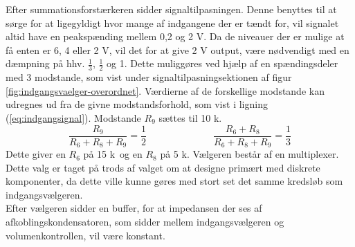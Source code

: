 Efter summationsforstærkeren sidder signaltilpasningen. Denne benyttes til at sørge for at ligegyldigt hvor mange af indgangene der er tændt for, vil signalet altid have en peakspænding mellem 0,2 og 2 V. Da de niveauer der er mulige at få enten er 6, 4 eller 2 V, vil det for at give 2 V output, være nødvendigt med en dæmpning på hhv. $\frac{1}{3}$, $\frac{1}{2}$ og 1. Dette muliggøres ved hjælp af en spændingsdeler med 3 modstande, som vist under signaltilpasningsektionen af figur \ref{fig:indgangsvaelger-overordnet}. Værdierne af de forskellige modstande kan udregnes ud fra de givne modstandsforhold, som vist i ligning (\ref{eq:indgangsignal}). Modstande $R_9$ sættes til 10 k\ohm.
\begin{equation}
\label{eq:indgangsignal}
\frac{R_9}{R_6+R_8+R_9}=\frac{1}{2} \;\;\;\;\;\;\;\;\;\;\;\;~~~~~~~~~~~~~~~~
\frac{R_6+R_8}{R_6+R_8+R_9}=\frac{1}{3}
\end{equation}
Dette giver en $R_6$ på 15 k\ohm~og en $R_8$ på 5 k\ohm.
Vælgeren består af en multiplexer. Dette valg er taget på trods af valget om at designe primært med diskrete komponenter, da dette ville kunne gøres med stort set det samme kredsløb som indgangsvælgeren. \\Efter vælgeren sidder en buffer, for at impedansen der ses af afkoblingskondensatoren, som sidder mellem indgangsvælgeren og volumenkontrollen, vil være konstant.